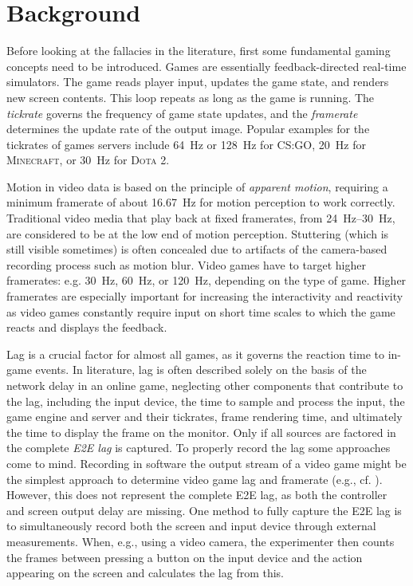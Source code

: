 \section{Background}
\label{sec:background}

Before looking at the fallacies in the literature, first some fundamental gaming concepts need to be introduced. Games are essentially feedback-directed real-time simulators. The game reads player input, updates the game state, and renders new screen contents. This loop repeats as long as the game is running. The \textit{tickrate} governs the frequency of game state updates, and the \textit{framerate} determines the update rate of the output image. Popular examples for the tickrates of games servers include \SI{64}{\hertz} or \SI{128}{\hertz} for \textsc{CS:GO}, \SI{20}{\hertz} for \textsc{Minecraft}, or \SI{30}{\hertz} for \textsc{Dota 2}.

Motion in video data is based on the principle of \textit{apparent motion}, requiring a minimum framerate of about \SI{16.67}{\hertz} for motion perception to work correctly. Traditional video media that play back at fixed framerates, from \SIrange{24}{30}{\hertz}, are considered to be at the low end of motion perception. Stuttering (which is still visible sometimes) is often concealed due to artifacts of the camera-based recording process such as motion blur. Video games have to target higher framerates: e.g. \SI{30}{\hertz}, \SI{60}{\hertz}, or \SI{120}{\hertz}, depending on the type of game. Higher framerates are especially important for increasing the interactivity and reactivity as video games constantly require input on short time scales to which the game reacts and displays the feedback.

Lag is a crucial factor for almost all games, as it governs the reaction time to in-game events. In literature, lag is often described solely on the basis of the network delay in an online game, neglecting other components that contribute to the lag, including the input device, the time to sample and process the input, the game engine and server and their tickrates, frame rendering time, and ultimately the time to display the frame on the monitor. Only if all sources are factored in the complete \textit{\gls{E2E} lag} is captured. To properly record the lag some approaches come to mind. Recording in software the output stream of a video game might be the simplest approach to determine video game lag and framerate (e.g., cf. \cite{Chen:2011:MLC:2072298.2071991}). However, this does not represent the complete \gls{E2E} lag, as both the controller and screen output delay are missing. One method to fully capture the \gls{E2E} lag is to simultaneously record both the screen and input device through external measurements. When, e.g., using a video camera, the experimenter then counts the frames between pressing a button on the input device and the action appearing on the screen and calculates the lag from this.

